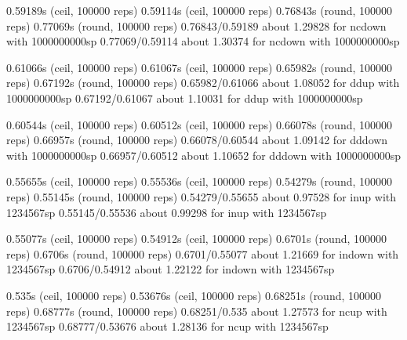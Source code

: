 0.59189s (ceil, 100000 reps)                               0.59114s (ceil, 100000 reps)                              
0.76843s (round, 100000 reps)                              0.77069s (round, 100000 reps)                             
0.76843/0.59189 about 1.29828 for ncdown with 1000000000sp 0.77069/0.59114 about 1.30374 for ncdown with 1000000000sp
                                                                                                                     
0.61066s (ceil, 100000 reps)                               0.61067s (ceil, 100000 reps)                              
0.65982s (round, 100000 reps)                              0.67192s (round, 100000 reps)                             
0.65982/0.61066 about 1.08052 for ddup with 1000000000sp   0.67192/0.61067 about 1.10031 for ddup with 1000000000sp  
                                                                                                                     
0.60544s (ceil, 100000 reps)                               0.60512s (ceil, 100000 reps)                              
0.66078s (round, 100000 reps)                              0.66957s (round, 100000 reps)                             
0.66078/0.60544 about 1.09142 for dddown with 1000000000sp 0.66957/0.60512 about 1.10652 for dddown with 1000000000sp
                                                                                                                     
0.55655s (ceil, 100000 reps)                               0.55536s (ceil, 100000 reps)                              
0.54279s (round, 100000 reps)                              0.55145s (round, 100000 reps)                             
0.54279/0.55655 about 0.97528 for inup with 1234567sp      0.55145/0.55536 about 0.99298 for inup with 1234567sp     
                                                                                                                     
0.55077s (ceil, 100000 reps)                               0.54912s (ceil, 100000 reps)                              
0.6701s (round, 100000 reps)                               0.6706s (round, 100000 reps)                              
0.6701/0.55077 about 1.21669 for indown with 1234567sp     0.6706/0.54912 about 1.22122 for indown with 1234567sp    
                                                                                                                     
0.535s (ceil, 100000 reps)                                 0.53676s (ceil, 100000 reps)                              
0.68251s (round, 100000 reps)                              0.68777s (round, 100000 reps)                             
0.68251/0.535 about 1.27573 for ncup with 1234567sp        0.68777/0.53676 about 1.28136 for ncup with 1234567sp     
                                                                                                                     
